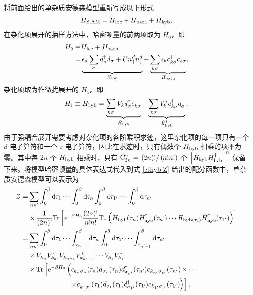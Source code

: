 将前面给出的单杂质安德森模型重新写成以下形式 
\begin{equation}
    H_{\mathrm{SIAM}}=H_{\mathrm{loc}}+H_{\mathrm{bath}}+H_{\mathrm{hyb}},
\end{equation}
在杂化项展开的抽样方法中，哈密顿量的前两项取为 $H_0$，即 
\begin{equation}
    \begin{aligned}
        H_0\equiv& H_{\mathrm{loc}}+H_{\mathrm{bath}}\\
        =& \underbrace{\epsilon_d\sum_{\sigma}d_\sigma^\dagger d_\sigma+U n_{\uparrow}^d n_{\downarrow}^d}_{H_{\mathrm{loc}}}+\underbrace{\sum_{k\sigma}\epsilon_k c_{k\sigma}^\dagger c_{k\sigma}}_{H_{\mathrm{bath}}},
    \end{aligned}
\end{equation}
杂化项取为作微扰展开的 $H_1$，即 
\begin{equation}
    H_1\equiv H_{\mathrm{hyb}}=\underbrace{\sum_{k\sigma}V_k d_\sigma^\dagger c_{k\sigma}^{ }}_{\tilde{H}_{\mathrm{hyb}}}+\underbrace{\sum_{k\sigma}V_k^* c_{k\sigma}^\dagger d_\sigma^{ }}_{\tilde{H}_{\mathrm{hyb}}^\dagger}.
\end{equation}
由于强耦合展开需要考虑对杂化项的各阶乘积求迹，这里杂化项的每一项只有一个 $d$ 电子算符和一个 $c$ 电子算符，因此在求迹时，只有偶数个 $H_{\mathrm{hyb}}$ 相乘的项不为零。其中每 $2n$ 个 $H_{\mathrm{hyb}}$ 相乘时，只有 $\mathrm{C}_{2n}^n=\left. (2n)!\right/(n!n!)$ 个 $\left[ \tilde{H}_{\mathrm{hyb}}\tilde{H}_{\mathrm{hyb}}^\dagger \right]^n$ 保留下来。将模型哈密顿量的具体表达式代入到式 \eqref{cthyb-Z} 给出的配分函数中，单杂质安德森模型可以表示为 
\begin{equation}
    \begin{aligned}
        \mathcal{Z}=& \sum_{nn'} \int_0^\beta \mathrm{d}\tau_1\cdots \int_0^\beta \mathrm{d}\tau_n \int_0^\beta\mathrm{d}\tau_{1'}\cdots \int_0^\beta \mathrm{d}\tau_{n'}\\
        &\times \frac{1}{(2n)!} \mathrm{Tr}\left[ \mathrm{e}^{-\beta H_0} \frac{(2n)!}{n!n!}\mathrm{T}_{\tau}\left( \tilde{H}_{\mathrm{hyb}}(\tau_n)\tilde{H}_{\mathrm{hyb}}^\dagger (\tau_{n'})\cdots \tilde{H}_{\mathrm{hyb}(\tau_1)}\tilde{H}_{\mathrm{hyb}}^\dagger (\tau_{1'}) \right) \right]\\
        =&\sum_{nn'}\int_0^\beta \mathrm{d}\tau_1\cdots\int_{\tau_{n-1}}^\beta\mathrm{d}\tau_n\int_0^\beta \mathrm{d}\tau_{1'}\cdots\int_{\tau_{n'-1}}^\beta\mathrm{d}\tau_{n'}\\
        &\times V_{k_n}^{ }V_{k_{n'}}^* V_{k_{n-1}}^{ }V_{k_{n'-1}}^*\cdots V_{k_1}^{ }V_{k_{1'}}^*\\
        & \times\mathrm{Tr}\left[ \mathrm{e}^{-\beta H_0}\left( c_{k_n\sigma_n}(\tau_n)d_{\sigma_n}(\tau_n)d_{\sigma_{n'}}^\dagger(\tau_{n'})c_{k_{n'}\sigma_{n'}}(\tau_{n'})\times \cdots \right.\right. \\
        & \qquad\qquad\quad\quad \left.\left. \times c_{k_1\sigma_1}^\dagger(\tau_1)d_{\sigma_1}(\tau_1)d_{\sigma_{1'}}^\dagger (\tau_{1'})c_{k_{1'}\sigma_{1'}}(\tau_{1'}) \right) \right],
    \end{aligned}
\end{equation}
